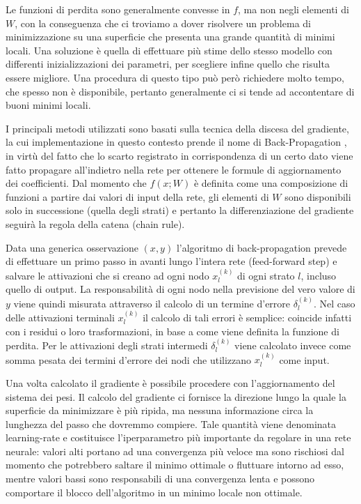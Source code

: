 Le funzioni di perdita sono generalmente convesse in $f$, ma non negli elementi di $W$, con la conseguenza che ci troviamo a dover risolvere un problema di minimizzazione su una superficie che presenta una grande quantità di minimi locali. Una soluzione è quella di effettuare più stime dello stesso modello con differenti inizializzazioni dei parametri, per scegliere infine quello che risulta essere migliore. Una procedura di questo tipo può però richiedere molto tempo, che spesso non è disponibile, pertanto generalmente ci si tende ad accontentare di buoni minimi locali.

I principali metodi utilizzati sono basati sulla tecnica della discesa del gradiente, la cui implementazione in questo contesto prende il nome di Back-Propagation \cite{werbos1974beyond}, in virtù del fatto che lo scarto registrato in corrispondenza di un certo dato viene fatto propagare all'indietro nella rete per ottenere le formule di aggiornamento dei coefficienti. Dal momento che $f(x;W)$ è definita come una composizione di funzioni a partire dai valori di input della rete, gli elementi di $W$ sono disponibili solo in successione (quella degli strati) e pertanto la differenziazione del gradiente seguirà la regola della catena (chain rule).

Data una generica osservazione $(x, y)$ l'algoritmo di back-propagation prevede di effettuare un primo passo in avanti lungo l'intera rete (feed-forward step) e salvare le attivazioni che si creano ad ogni nodo $x_{l}^{(k)}$ di ogni strato $l$, incluso quello di output. La responsabilità di ogni nodo nella previsione del vero valore di $y$ viene quindi misurata attraverso il calcolo di un termine d'errore $\delta_{l}^{(k)}$. Nel caso delle attivazioni terminali $x_{l}^{(k)}$ il calcolo di tali errori è semplice: coincide infatti con i residui o loro trasformazioni, in base a come viene definita la funzione di perdita. Per le attivazioni degli strati intermedi $\delta_{l}^{(k)}$ viene calcolato invece come somma pesata dei termini d'errore dei nodi che utilizzano $x_{l}^{(k)}$ come input.

Una volta calcolato il gradiente è possibile procedere con l'aggiornamento del sistema dei pesi. Il calcolo del gradiente ci fornisce la direzione lungo la quale la superficie da minimizzare è più ripida, ma nessuna informazione circa la lunghezza del passo che dovremmo compiere. Tale quantità viene denominata learning-rate e costituisce l'iperparametro più importante da regolare in una rete neurale: valori alti portano ad una convergenza più veloce ma sono rischiosi dal momento che potrebbero saltare il minimo ottimale o fluttuare intorno ad esso, mentre valori bassi sono responsabili di una convergenza lenta e possono comportare il blocco dell'algoritmo in un minimo locale non ottimale.


